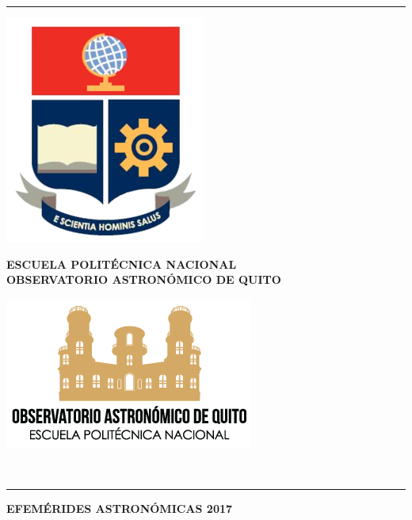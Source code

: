 \documentclass[12pt,a4paper,oneside]{article}
\begin{document}
\rule[1mm]{170mm}{0.20mm}
\begin{minipage}[d]{30mm}
\begin{center}
\includegraphics[scale=0.30]{logo_epn.png}
\end{center}
\end{minipage}
\begin{minipage}[d]{100mm}
\begin{center}
\vspace{0.5cm}
\textsf{\textbf{\large ESCUELA POLITÉCNICA NACIONAL}}\\
\textsf{\textbf{\small OBSERVATORIO ASTRONÓMICO DE QUITO}}\\
\end{center}
\end{minipage}
\begin{minipage}[d]{30mm}
\begin{center}
\includegraphics[scale=.40]{logo.png}
\end{center}
\end{minipage}\\
\rule[1mm]{170mm}{0.20mm}
\begin{center}
\textbf{\huge EFEM\'ERIDES ASTRON\'OMICAS 2017 \\}
\vspace{1cm}
\end{center}
\end{document}

